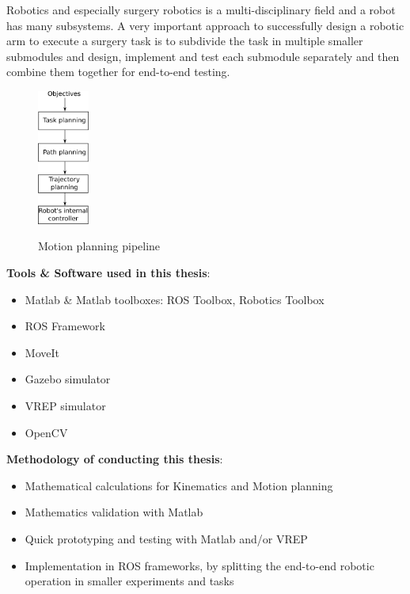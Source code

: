Robotics and especially surgery robotics is a multi-disciplinary field and a robot has many subsystems. A very important approach to successfully design a robotic arm to execute a surgery task is to subdivide the 
task in multiple smaller submodules and design, implement and test each submodule separately and then combine them together for end-to-end testing.

\begin{center}
\begin{figure}[!htb]
\centering
\includegraphics[width=0.15\textwidth]{images/motion-planning.png}\\
\caption{Motion planning pipeline}
\end{figure}
\end{center}

\textbf{Tools \& Software used in this thesis}:
\begin{itemize}
\item Matlab \& Matlab toolboxes: ROS Toolbox, Robotics Toolbox
\item ROS Framework
\item MoveIt
\item Gazebo simulator
\item VREP simulator
\item OpenCV
\end{itemize}

\textbf{Methodology of conducting this thesis}:
\begin{itemize}
\item Mathematical calculations for Kinematics and Motion planning
\item Mathematics validation with Matlab
\item Quick prototyping and testing with Matlab and/or VREP
\item Implementation in ROS frameworks, by splitting the end-to-end robotic operation in smaller 
experiments and tasks
\end{itemize}

